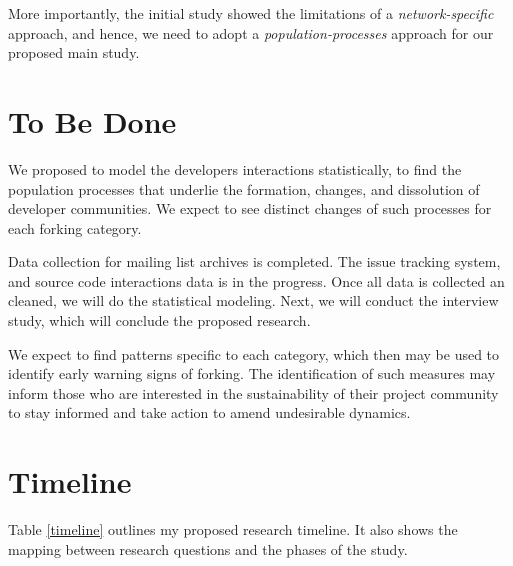 \documentclass[11pt]{report}
\begin{document}
More importantly, the initial study showed the limitations of a \textit{network-specific} approach, and hence, we need to adopt a \textit{population-processes} approach for our proposed main study.

\section{To Be Done}
\label{YetToBeDone}

We proposed to model the developers interactions statistically, to find the population processes that underlie the formation, changes, and dissolution of developer communities. We expect to see distinct changes of such processes for each forking category.

Data collection for mailing list archives is completed. The issue tracking system, and source code interactions data is in the progress. Once all data is collected an cleaned, we will do the statistical modeling. Next, we will conduct the interview study, which will conclude the proposed research. 

We expect to find patterns specific to each category, which then may be used to identify early warning signs of forking. The identification of such measures may inform those who are interested in the sustainability of their project community to stay informed and take action to amend undesirable dynamics. 

\section{Timeline}
\label{timelineSection}

Table \ref{timeline} outlines my proposed research timeline. It also shows the mapping between research questions and the phases of the study.
\end{document}
